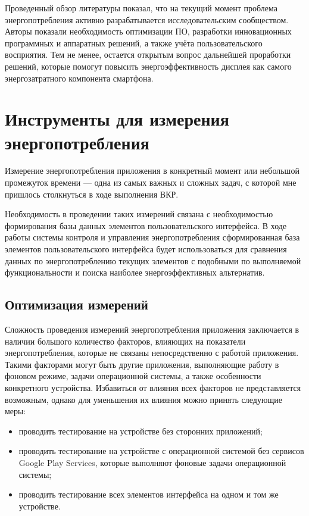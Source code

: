 \documentclass[a4paper,14pt]{extarticle} %
\begin{document}
	Проведенный обзор литературы показал, что на текущий момент проблема энергопотребления активно разрабатывается исследовательским сообществом. Авторы показали необходимость оптимизации ПО, разработки инновационных программных и аппаратных решений, а также учёта пользовательского восприятия. Тем не менее, остается открытым вопрос дальнейшей проработки решений, которые помогут повысить энергоэффективность дисплея как самого энергозатратного компонента смартфона.
	
	\newpage
	\section{Инструменты для измерения энергопотребления}
	
	Измерение энергопотребления приложения в конкретный момент или небольшой промежуток времени — одна из самых важных и сложных задач, с которой мне пришлось  столкнуться в ходе выполнения ВКР.
	
	Необходимость в проведении таких измерений связана с необходимостью формирования базы данных элементов пользовательского интерфейса. В ходе работы системы контроля и управления энергопотребления  сформированная база элементов пользовательского интерфейса будет использоваться для сравнения данных по энергопотреблению текущих элементов с подобными по выполняемой функциональности и поиска наиболее энергоэффективных альтернатив.
	
	\subsection{Оптимизация измерений}
	
	Сложность проведения измерений энергопотребления приложения заключается в наличии большого количество факторов, влияющих на показатели энергопотребления, которые не связаны непосредственно с работой приложения. Такими факторами могут быть другие приложения, выполняющие работу в фоновом режиме, задачи операционной системы, а также особенности конкретного устройства. Избавиться от влияния всех факторов не представляется возможным, однако для уменьшения их влияния можно принять следующие меры:
	\begin{itemize}
		\item проводить тестирование на устройстве без сторонних приложений;
		\item проводить тестирование на устройстве с операционной системой без сервисов Google Play Services, которые выполняют фоновые задачи операционной системы;
		\item проводить тестирование всех элементов интерфейса на одном и том же устройстве.
	\end{itemize}
	
\end{document}

